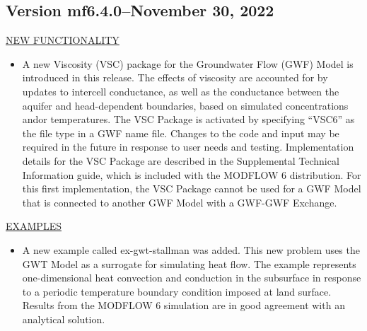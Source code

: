 	\subsection{Version mf6.4.0--November 30, 2022}
	
	\underline{NEW FUNCTIONALITY}
	\begin{itemize}
		\item A new Viscosity (VSC) package for the Groundwater Flow (GWF) Model is introduced in this release.  The effects of viscosity are accounted for by updates to intercell conductance, as well as the conductance between the aquifer and head-dependent boundaries, based on simulated concentrations and\/or temperatures.  The VSC Package is activated by specifying ``VSC6'' as the file type in a GWF name file.  Changes to the code and input may be required in the future in response to user needs and testing.  Implementation details for the VSC Package are described in the Supplemental Technical Information guide, which is included with the MODFLOW 6 distribution.  For this first implementation, the VSC Package cannot be used for a GWF Model that is connected to another GWF Model with a GWF-GWF Exchange.
	\end{itemize}

	\underline{EXAMPLES}
	\begin{itemize}
		\item A new example called ex-gwt-stallman was added.  This new problem uses the GWT Model as a surrogate for simulating heat flow.  The example represents one-dimensional heat convection and conduction in the subsurface in response to a periodic temperature boundary condition imposed at land surface.  Results from the MODFLOW 6 simulation are in good agreement with an analytical solution.
	\end{itemize}

